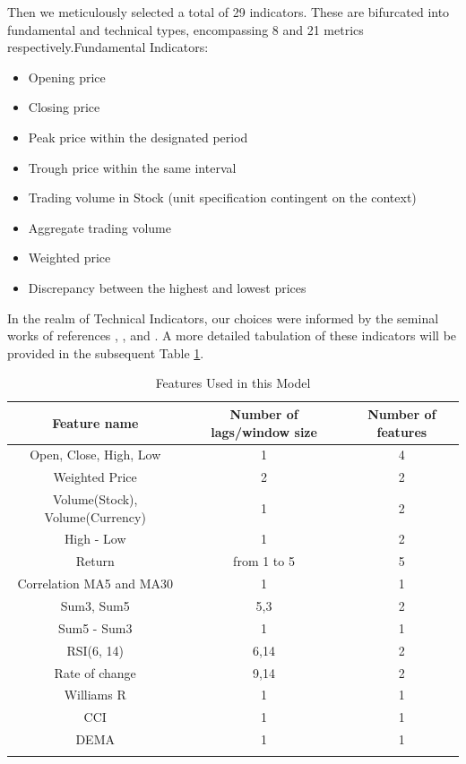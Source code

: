 \documentclass[sn-mathphys,Numbered]{sn-jnl}
\theoremstyle{thmstyleone}%
\theoremstyle{thmstyletwo}%
\theoremstyle{thmstylethree}%
\begin{document}
Then we meticulously selected a total of 29 indicators. These are bifurcated into fundamental and technical types, encompassing 8 and 21 metrics respectively.Fundamental Indicators:
\begin{itemize}
    \item Opening price
    \item Closing price
    \item Peak price within the designated period
    \item Trough price within the same interval
    \item Trading volume in Stock (unit specification contingent on the context)
    \item Aggregate trading volume
    \item Weighted price 
    \item Discrepancy between the highest and lowest prices
\end{itemize}

In the realm of Technical Indicators, our choices were informed by the seminal works of references \cite{kara2011prediction}, \cite{guresen2011using}, and \cite{achelis2005technical}. A more detailed tabulation of these indicators will be provided in the subsequent Table \ref{tab_1}.



\begin{table}[h]
\caption{Features Used in this Model}\label{tab_1}%
\begin{tabular}{@{}ccc@{}}
\toprule
Feature name & Number of lags/window size  & Number of features \\
\midrule
Open, Close, High, Low     & 1   & 4    \\
Weighted Price     & 2   & 2    \\
Volume(Stock), Volume(Currency)     & 1   & 2    \\
High - Low   & 1   & 2    \\
Return    & from 1 to 5   & 5    \\
Correlation MA5 and MA30   & 1   & 1    \\
Sum3, Sum5    & 5,3   & 2    \\
Sum5 - Sum3    & 1   & 1   \\
RSI(6, 14)    & 6,14   & 2    \\
Rate of change    & 9,14   & 2   \\
Williams R    & 1   & 1    \\
CCI & 1 & 1   \\
DEMA & 1 & 1 \\
\botrule
\end{tabular}
\end{table}
\end{document}

